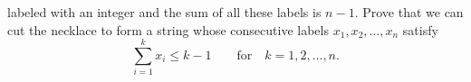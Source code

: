 labeled with an integer and the sum of all these labels is $n-1$.
Prove that we can cut the necklace to form a string whose
consecutive labels $x_{1},x_{2},\dots,x_{n}$ satisfy
\[
\sum_{i=1}^{k} x_{i} \leq k-1 \qquad \mbox{for} \quad k=1,2,\dots,n.
\]

